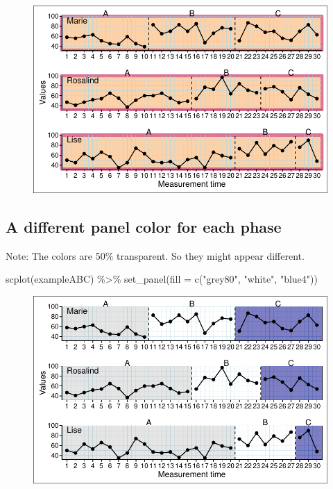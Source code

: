 \documentclass[
  letterpaper,
  DIV=11,
  numbers=noendperiod]{scrreprt}
\newenvironment{Shaded}{\begin{snugshade}}{\end{snugshade}}
\newcommand{\AttributeTok}[1]{\textcolor[rgb]{0.40,0.45,0.13}{#1}}
\newcommand{\FunctionTok}[1]{\textcolor[rgb]{0.28,0.35,0.67}{#1}}
\newcommand{\NormalTok}[1]{\textcolor[rgb]{0.00,0.23,0.31}{#1}}
\newcommand{\SpecialCharTok}[1]{\textcolor[rgb]{0.37,0.37,0.37}{#1}}
\newcommand{\StringTok}[1]{\textcolor[rgb]{0.13,0.47,0.30}{#1}}
\begin{document}
\begin{figure}[H]

{\centering \includegraphics{./ch_scplot_files/figure-pdf/pannel1-1.pdf}

}

\end{figure}

\hypertarget{a-different-panel-color-for-each-phase}{%
\subsection{A different panel color for each
phase}\label{a-different-panel-color-for-each-phase}}

Note: The colors are 50\% transparent. So they might appear different.

\begin{Shaded}
\begin{Highlighting}[]
\FunctionTok{scplot}\NormalTok{(exampleABC) }\SpecialCharTok{\%\textgreater{}\%}
  \FunctionTok{set\_panel}\NormalTok{(}\AttributeTok{fill =} \FunctionTok{c}\NormalTok{(}\StringTok{"grey80"}\NormalTok{, }\StringTok{"white"}\NormalTok{, }\StringTok{"blue4"}\NormalTok{))}
\end{Highlighting}
\end{Shaded}

\begin{figure}[H]

{\centering \includegraphics{./ch_scplot_files/figure-pdf/pannel2-1.pdf}

}

\end{figure}
\end{document}
